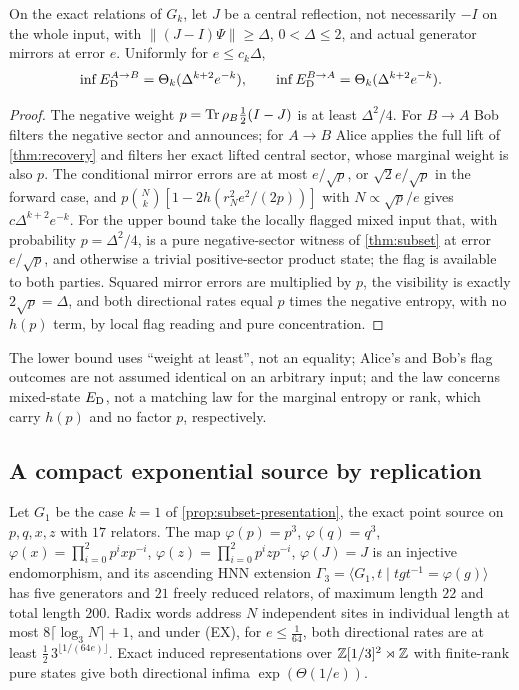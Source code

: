 \begin{theorem}\label{thm:subset-visibility}
On the exact relations of $G_k$, let $J$ be a central reflection, not necessarily $-I$ on the whole input, with
$\|(J-I)\Psi\|\ge\Delta$, $0<\Delta\le2$, and actual generator mirrors at error $e$. Uniformly for $e\le c_k\Delta$,
\[
\inf E_{\mathrm D}^{A\to B}=\Theta_k(\Delta^{k+2}e^{-k}),\qquad\inf E_{\mathrm D}^{B\to A}=\Theta_k(\Delta^{k+2}e^{-k}).
\]
\end{theorem}

\begin{proof}
The negative weight $p=\operatorname{Tr}\rho_B\frac12(I-J)$ is at least $\Delta^2/4$. For $B\to A$ Bob filters the negative sector and announces; for
$A\to B$ Alice applies the full lift of \cref{thm:recovery} and filters her exact lifted central sector, whose marginal weight is
also $p$. The conditional mirror errors are at most $e/\sqrt p$, or $\sqrt2e/\sqrt p$ in the forward case, and
$p\binom Nk[1-2h(r_N^2e^2/(2p))]$ with $N\propto\sqrt p/e$ gives $c\Delta^{k+2}e^{-k}$. For the upper bound take the locally flagged mixed
input that, with probability $p=\Delta^2/4$, is a pure negative-sector witness of \cref{thm:subset} at error $e/\sqrt p$, and otherwise a
trivial positive-sector product state; the flag is available to both parties. Squared mirror errors are multiplied by $p$, the
visibility is exactly $2\sqrt p=\Delta$, and both directional rates equal $p$ times the negative entropy, with no $h(p)$ term, by
local flag reading and pure concentration.
\end{proof}

The lower bound uses ``weight at least'', not an equality; Alice's and Bob's flag outcomes are not assumed identical on an
arbitrary input; and the law concerns mixed-state $E_{\mathrm D}$, not a matching law for the marginal entropy or rank, which carry $h(p)$
and no factor $p$, respectively.

\subsection{A compact exponential source by replication}\label{sec:exact-gamma}

\begin{theorem}\label{thm:gamma3}
Let $G_1$ be the case $k=1$ of \cref{prop:subset-presentation}, the exact point source on $p,q,x,z$ with $17$ relators. The map
$\varphi(p)=p^3$, $\varphi(q)=q^3$, $\varphi(x)=\prod_{i=0}^2p^ixp^{-i}$, $\varphi(z)=\prod_{i=0}^2p^izp^{-i}$, $\varphi(J)=J$ is an injective
endomorphism, and its ascending HNN extension $\Gamma_3=\langle G_1,t\mid tgt^{-1}=\varphi(g)\rangle$ has five generators and $21$ freely
reduced relators, of maximum length $22$ and total length $200$. Radix words address $N$ independent sites in individual length
at most $8\lceil\log_3N\rceil+1$, and under (EX), for $e\le\frac1{64}$, both directional rates are at least $\frac12\,3^{\lfloor1/(64e)\rfloor}$. Exact
induced representations over $\mathbb Z[1/3]^2\rtimes\mathbb Z$ with finite-rank pure states give both directional infima $\exp(\Theta(1/e))$.
\end{theorem}


